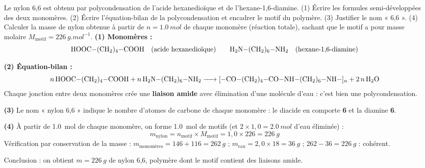 \documentclass[11pt]{article}
\begin{document}
\begin{exoresolu}[Le nylon 6,6]
Le nylon 6,6 est obtenu par polycondensation de l'acide hexanedioïque et de l'hexane-1,6-diamine. (1) Écrire les formules semi-développées des deux monomères. (2) Écrire l'équation-bilan de la polycondensation et encadrer le motif du polymère. (3) Justifier le nom « 6,6 ». (4) Calculer la masse de nylon obtenue à partir de $n = \SI{1,0}{mol}$ de chaque monomère (réaction totale), sachant que le motif a pour masse molaire $M_{\text{motif}} = \SI{226}{g.mol^{-1}}$.
\tcblower
\textbf{(1) Monomères :}
\[ \ce{HOOC-(CH2)4-COOH} \quad \text{(acide hexanedioïque)} \qquad \ce{H2N-(CH2)6-NH2} \quad \text{(hexane-1,6-diamine)} \]

\textbf{(2) Équation-bilan :}
\[ \ce{n HOOC-(CH2)4-COOH + n H2N-(CH2)6-NH2 -> [-CO-(CH2)4-CO-NH-(CH2)6-NH-]_n + 2n H2O} \]
Chaque jonction entre deux monomères crée une \textbf{liaison amide}  avec élimination d'une molécule d'eau : c'est bien une polycondensation.

\textbf{(3)} Le nom « nylon 6,6 » indique le nombre d'atomes de carbone de chaque monomère : le diacide en comporte \textbf{6} et la diamine \textbf{6}.

\textbf{(4)} À partir de \SI{1,0}{mol} de chaque monomère, on forme \SI{1,0}{mol} de motifs (et $2 \times 1{,}0 = \SI{2,0}{mol}$ d'eau éliminée) :
\[ m_{\text{nylon}} = n_{\text{motif}} \times M_{\text{motif}} = 1,0 \times 226 = \SI{226}{g} \]
Vérification par conservation de la masse : $m_{\text{monomères}} = 146 + 116 = \SI{262}{g}$ ; $m_{\text{eau}} = 2{,}0 \times 18 = \SI{36}{g}$ ; $262 - 36 = \SI{226}{g}$ : cohérent.

Conclusion : on obtient $\boxed{m = \SI{226}{g}}$ de nylon 6,6, polymère dont le motif contient des liaisons amide.
\end{exoresolu}
\end{document}
